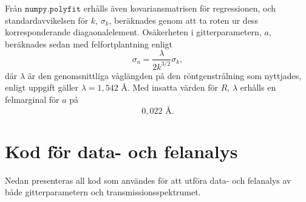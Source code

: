 \documentclass[12pt, a4paper]{article}
\begin{document}
Från $\texttt{numpy.polyfit}$ erhålls även kovariansmatrisen för regressionen, och standardavvikelsen för $k$, $\sigma_k$, beräknades genom att ta roten ur dess korresponderande diagaonalelement.
Osäkerheten i gitterparametern, $a$, beräknades sedan med felfortplantning enligt
\begin{equation}
    \sigma_a = \dfrac{\lambda}{2k^{3/2}}\sigma_k,
\end{equation}
där $\lambda$ är den genomsnittliga våglängden på den röntgenstrålning som nyttjades, enligt uppgift gäller $\lambda = 1,542$ Å. Med insatta värden för $R$, $\lambda$ erhålls en felmarginal för $a$ på
\begin{equation}
    0,022 \text{ Å}.
\end{equation}

\section{Kod för data- och felanalys}
Nedan presenteras all kod som användes för att utföra data- och felanalys av både gitterparametern och transmissionsspektrumet.
\end{document}
